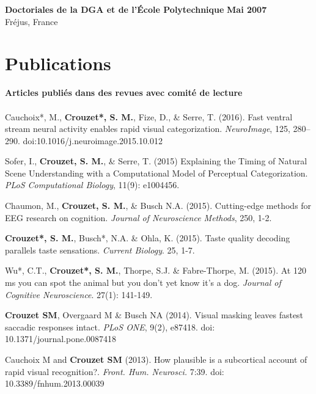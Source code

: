 \documentclass[margin,line]{resume}
\begin{document}
\begin{resume}
	\textbf{Doctoriales de la DGA et de l'École Polytechnique} \hfill \textbf{Mai 2007}\\
	Fréjus, France
	\vspace{-1.5mm}


\vspace{3mm}	
\section{\mysidestyle Publications}

\textbf{Articles publiés dans des revues avec comité de lecture}\\\\
    Cauchoix*, M., \textbf{Crouzet*, S. M.}, Fize, D., \& Serre, T. (2016). Fast ventral stream neural activity enables rapid visual categorization. \textit{NeuroImage}, 125, 280–290. doi:10.1016/j.neuroimage.2015.10.012

	\vspace{-2mm} Sofer, I., \textbf{Crouzet, S. M.}, \& Serre, T. (2015) Explaining the Timing of Natural Scene Understanding with a Computational Model of Perceptual Categorization. \textit{PLoS Computational Biology}, 11(9): e1004456.

	\vspace{-2mm} Chaumon, M., \textbf{Crouzet, S. M.}, \& Busch N.A. (2015). Cutting-edge methods for EEG research on cognition. \textit{Journal of Neuroscience Methods}, 250, 1-2.

\newpage

	\vspace{-2mm} \textbf{Crouzet*, S. M.}, Busch*, N.A. \& Ohla, K. (2015). Taste quality decoding parallels taste sensations. \textit{Current Biology}. 25, 1-7.

	\vspace{-2mm} Wu*, C.T.,  \textbf{Crouzet*, S. M.}, Thorpe, S.J. \& Fabre-Thorpe, M. (2015). At 120 ms you can spot the animal but you don't yet know it's a dog. \textit{Journal of Cognitive Neuroscience}. 27(1): 141-149.

  	\vspace{-2mm} \textbf{Crouzet SM}, Overgaard M \& Busch NA (2014). Visual masking leaves fastest saccadic responses intact. \textit{PLoS ONE}, 9(2), e87418. doi: 10.1371/journal.pone.0087418

	\vspace{-2mm} Cauchoix M and \textbf{Crouzet SM} (2013). How plausible is a subcortical account of rapid visual recognition?. \textit{Front. Hum. Neurosci.} 7:39. doi: 10.3389/fnhum.2013.00039
	

\end{resume}
\end{document}
